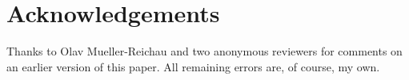 \documentclass[output=paper]{langscibook}
\begin{document}
\section*{Acknowledgements}
Thanks to Olav Mueller-Reichau and two anonymous reviewers for comments on an earlier version of this paper. All remaining errors are, of course, my own. 

\printbibliography[heading=subbibliography,notkeyword=this]
\end{document}
